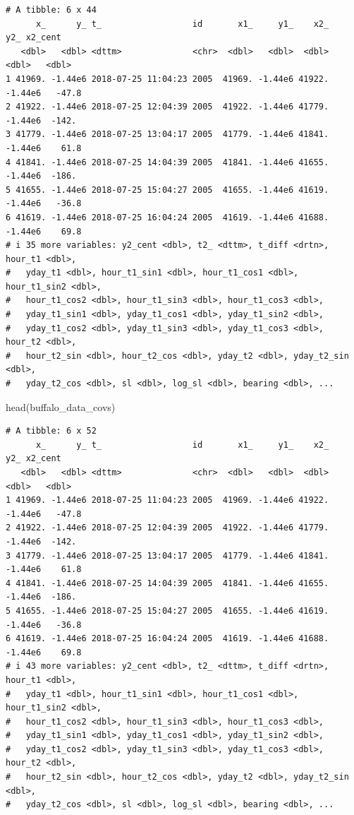 \documentclass[
  letterpaper,
  DIV=11,
  numbers=noendperiod]{scrartcl}
\newenvironment{Shaded}{\begin{snugshade}}{\end{snugshade}}
\newcommand{\FunctionTok}[1]{\textcolor[rgb]{0.28,0.35,0.67}{#1}}
\newcommand{\NormalTok}[1]{\textcolor[rgb]{0.00,0.23,0.31}{#1}}
\begin{document}
\begin{verbatim}
# A tibble: 6 x 44
      x_      y_ t_                  id       x1_     y1_    x2_     y2_ x2_cent
   <dbl>   <dbl> <dttm>              <chr>  <dbl>   <dbl>  <dbl>   <dbl>   <dbl>
1 41969. -1.44e6 2018-07-25 11:04:23 2005  41969. -1.44e6 41922. -1.44e6   -47.8
2 41922. -1.44e6 2018-07-25 12:04:39 2005  41922. -1.44e6 41779. -1.44e6  -142. 
3 41779. -1.44e6 2018-07-25 13:04:17 2005  41779. -1.44e6 41841. -1.44e6    61.8
4 41841. -1.44e6 2018-07-25 14:04:39 2005  41841. -1.44e6 41655. -1.44e6  -186. 
5 41655. -1.44e6 2018-07-25 15:04:27 2005  41655. -1.44e6 41619. -1.44e6   -36.8
6 41619. -1.44e6 2018-07-25 16:04:24 2005  41619. -1.44e6 41688. -1.44e6    69.8
# i 35 more variables: y2_cent <dbl>, t2_ <dttm>, t_diff <drtn>, hour_t1 <dbl>,
#   yday_t1 <dbl>, hour_t1_sin1 <dbl>, hour_t1_cos1 <dbl>, hour_t1_sin2 <dbl>,
#   hour_t1_cos2 <dbl>, hour_t1_sin3 <dbl>, hour_t1_cos3 <dbl>,
#   yday_t1_sin1 <dbl>, yday_t1_cos1 <dbl>, yday_t1_sin2 <dbl>,
#   yday_t1_cos2 <dbl>, yday_t1_sin3 <dbl>, yday_t1_cos3 <dbl>, hour_t2 <dbl>,
#   hour_t2_sin <dbl>, hour_t2_cos <dbl>, yday_t2 <dbl>, yday_t2_sin <dbl>,
#   yday_t2_cos <dbl>, sl <dbl>, log_sl <dbl>, bearing <dbl>, ...
\end{verbatim}

\begin{Shaded}
\begin{Highlighting}[]
\FunctionTok{head}\NormalTok{(buffalo\_data\_covs)}
\end{Highlighting}
\end{Shaded}

\begin{verbatim}
# A tibble: 6 x 52
      x_      y_ t_                  id       x1_     y1_    x2_     y2_ x2_cent
   <dbl>   <dbl> <dttm>              <chr>  <dbl>   <dbl>  <dbl>   <dbl>   <dbl>
1 41969. -1.44e6 2018-07-25 11:04:23 2005  41969. -1.44e6 41922. -1.44e6   -47.8
2 41922. -1.44e6 2018-07-25 12:04:39 2005  41922. -1.44e6 41779. -1.44e6  -142. 
3 41779. -1.44e6 2018-07-25 13:04:17 2005  41779. -1.44e6 41841. -1.44e6    61.8
4 41841. -1.44e6 2018-07-25 14:04:39 2005  41841. -1.44e6 41655. -1.44e6  -186. 
5 41655. -1.44e6 2018-07-25 15:04:27 2005  41655. -1.44e6 41619. -1.44e6   -36.8
6 41619. -1.44e6 2018-07-25 16:04:24 2005  41619. -1.44e6 41688. -1.44e6    69.8
# i 43 more variables: y2_cent <dbl>, t2_ <dttm>, t_diff <drtn>, hour_t1 <dbl>,
#   yday_t1 <dbl>, hour_t1_sin1 <dbl>, hour_t1_cos1 <dbl>, hour_t1_sin2 <dbl>,
#   hour_t1_cos2 <dbl>, hour_t1_sin3 <dbl>, hour_t1_cos3 <dbl>,
#   yday_t1_sin1 <dbl>, yday_t1_cos1 <dbl>, yday_t1_sin2 <dbl>,
#   yday_t1_cos2 <dbl>, yday_t1_sin3 <dbl>, yday_t1_cos3 <dbl>, hour_t2 <dbl>,
#   hour_t2_sin <dbl>, hour_t2_cos <dbl>, yday_t2 <dbl>, yday_t2_sin <dbl>,
#   yday_t2_cos <dbl>, sl <dbl>, log_sl <dbl>, bearing <dbl>, ...
\end{verbatim}
\end{document}
